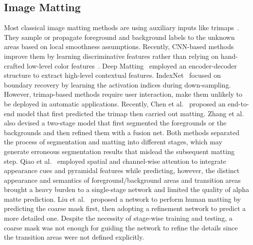 \documentclass[twocolumn]{svjour3}
\begin{document}
\subsection{Image Matting} 
Most classical image matting methods are using auxiliary inputs like trimaps~\citep{li2017patch,sun2004poisson,levin2008spectral,chen2013knn,levin2007closed}. They sample or propagate foreground and background labels to the unknown areas based on local smoothness assumptions. Recently, CNN-based methods improve them by learning discriminative features rather than relying on hand-crafted low-level color features~\citep{xu2017deep,lu2019indices,hou2019context,cai2019disentangled,tang2019learning}. Deep Matting~\citep{xu2017deep} employed an encoder-decoder structure to extract high-level contextual features. IndexNet~\citep{lu2019indices} focused on boundary recovery by learning the activation indices during down-sampling. However, trimap-based methods require user interaction, make them unlikely to be deployed in automatic applications. Recently, Chen et al.~\citep{chen2018semantic} proposed an end-to-end model that first predicted the trimap then carried out matting. Zhang et al.~\citep{zhang2019late} also devised a two-stage model that first segmented the foregrounds or the backgrounds and then refined them with a fusion net. Both methods separated the process of segmentation and matting into different stages, which may generate erroneous segmentation results that mislead the subsequent matting step. Qiao et al.~\citep{Qiao_2020_CVPR} employed spatial and channel-wise attention to integrate appearance cues and pyramidal features while predicting, however, the distinct appearance and semantics of foreground/background areas and transition areas brought a heavy burden to a single-stage network and limited the quality of alpha matte prediction. Liu et al.~\citep{liu2020boosting} proposed a network to perform human matting by predicting the coarse mask first, then adopting a refinement network to predict a more detailed one. Despite the necessity of stage-wise training and testing, a coarse mask was not enough for guiding the network to refine the details since the transition areas were not defined explicitly.
\end{document}

